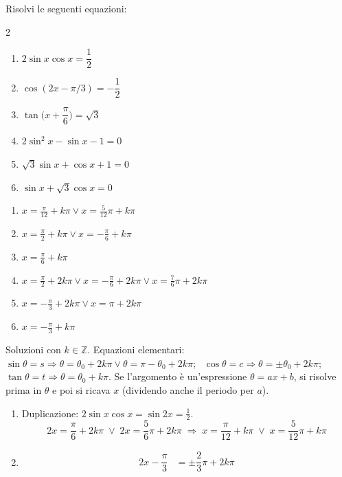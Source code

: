 \begin{question}[ID=4.2, subtitle={Equazioni goniometriche con duplicazione — serie 2}, tags={goniometria, equazioni goniometriche}, difficulty=media]
Risolvi le seguenti equazioni:
\begin{multicols}{2}
\begin{enumerate}
\item $2 \sin x  \cos x= \dfrac{1}{2}$
\item $\cos(2x - \pi/3) = -\dfrac{1}{2}$
\item $\tan\Big(x + \dfrac{\pi}{6}\Big) = \sqrt{3}$
\item $2 \sin^2 x - \sin x - 1 = 0$
\item $\sqrt{3} \sin x + \cos x + 1 = 0 $
\item $\sin x + \sqrt{3} \cos x = 0$
\end{enumerate}
\end{multicols}
\begin{solution}
\begin{enumerate}
    \item $x=\tfrac\pi{12}+k\pi \vee x=\tfrac5{12}\pi+k\pi$
    \item $x=\tfrac\pi2+k\pi \vee x=-\tfrac\pi6+k\pi$
    \item $x=\tfrac\pi6+k\pi$
    \item $x=\tfrac\pi2+2k\pi \vee x=-\tfrac\pi6+2k\pi \vee x=\tfrac76\pi+2k\pi$
    \item $x=-\tfrac\pi3+2k\pi \vee x=\pi+2k\pi$
    \item $x=-\tfrac\pi3+k\pi$
\end{enumerate}
\end{solution}
\begin{explanation}
Soluzioni con $k\in\mathbb{Z}$. Equazioni elementari: \ $\sin\theta=s \Rightarrow \theta=\theta_0+2k\pi \vee \theta=\pi-\theta_0+2k\pi$; \ $\cos\theta=c \Rightarrow \theta=\pm\theta_0+2k\pi$; \ $\tan\theta=t \Rightarrow \theta=\theta_0+k\pi$. Se l'argomento è un'espressione $\theta=ax+b$, si risolve prima in $\theta$ e poi si ricava $x$ (dividendo anche il periodo per $a$).
\begin{enumerate}
    \item Duplicazione: $2\sin x\cos x=\sin2x=\tfrac12$.
    \[ 2x=\dfrac\pi6+2k\pi \;\vee\; 2x=\dfrac56\pi+2k\pi \;\Rightarrow\; x=\dfrac\pi{12}+k\pi \;\vee\; x=\dfrac5{12}\pi+k\pi \]
    \item \[\begin{aligned}
    2x-\dfrac\pi3 &= \pm\dfrac23\pi+2k\pi\\

\end{aligned}\]
\end{enumerate}
\end{explanation}
\end{question}
